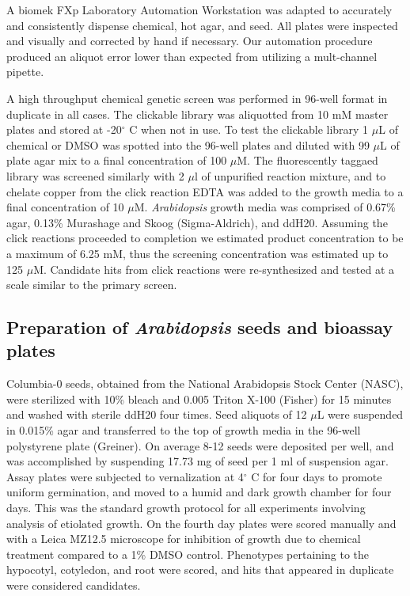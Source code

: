 A biomek FXp Laboratory Automation Workstation was adapted to accurately and consistently dispense chemical, hot agar, and seed. All plates were inspected and visually and corrected by hand if necessary. Our automation procedure produced an aliquot error lower than expected from utilizing a mult-channel pipette.

A high throughput chemical genetic screen was performed in 96-well format in duplicate in all cases. The clickable library was aliquotted from 10 mM master plates and stored at -20${}^\circ$ C when not in use. To test the clickable library 1 $\mu$L of chemical or DMSO was spotted into the 96-well plates and diluted with 99 $\mu$L of plate agar mix to a final concentration of 100 $\mu$M. The fluorescently taggaed library was screened similarly with 2 $\mu$l of unpurified reaction mixture, and to chelate copper from the click reaction EDTA was added to the growth media to a final concentration of 10 $\mu$M. {\it Arabidopsis} growth media was comprised of 0.67{\%} agar, 0.13{\%} Murashage and Skoog (Sigma-Aldrich), and ddH20. Assuming the click reactions proceeded to completion we estimated product concentration to be a maximum of 6.25 mM, thus the screening concentration was estimated up to 125 $\mu$M. Candidate hits from click reactions were re-synthesized and tested at a scale similar to the primary screen.

\subsection{Preparation of {\it Arabidopsis} seeds and bioassay plates}

Columbia-0 seeds, obtained from the National Arabidopsis Stock Center (NASC), were sterilized with 10{\%} bleach and 0.005 Triton X-100 (Fisher) for 15 minutes and washed with sterile ddH20 four times. Seed aliquots of 12 $\mu$L were suspended in 0.015{\%} agar and transferred to the top of growth media in the 96-well polystyrene plate (Greiner). On average 8-12 seeds were deposited per well, and was accomplished by suspending 17.73 mg of seed per 1 ml of suspension agar. Assay plates were subjected to vernalization at 4${}^\circ$ C for four days to promote uniform germination, and moved to a humid and dark growth chamber for four days. This was the standard growth protocol for all experiments involving analysis of etiolated growth. On the fourth day plates were scored manually and with a Leica MZ12.5 microscope for inhibition of growth due to chemical treatment compared to a 1{\%} DMSO control. Phenotypes pertaining to the hypocotyl, cotyledon, and root were scored, and hits that appeared in duplicate were considered candidates. 

